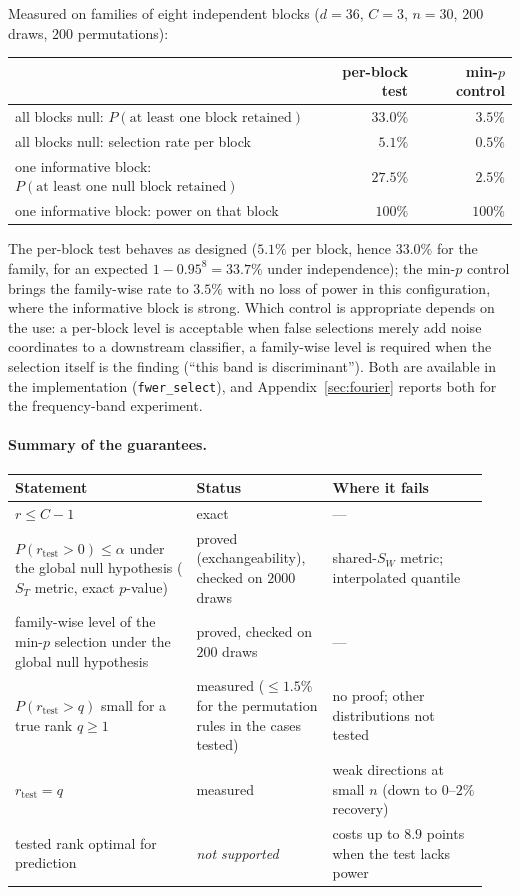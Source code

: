 \documentclass[11pt,a4paper]{article}
\theoremstyle{plain}
\theoremstyle{definition}
\theoremstyle{remark}
\begin{document}
Measured on families of eight independent blocks ($d=36$, $C=3$, $n=30$,
$200$ draws, $200$ permutations):
\begin{center}\small
\begin{tabular}{@{}lrr@{}}
\toprule
 & per-block test & min-$p$ control \\
\midrule
all blocks null: $P(\text{at least one block retained})$ & $33.0\%$ & $3.5\%$ \\
all blocks null: selection rate per block & $5.1\%$ & $0.5\%$ \\
one informative block: $P(\text{at least one null block retained})$ & $27.5\%$ & $2.5\%$ \\
one informative block: power on that block & $100\%$ & $100\%$ \\
\bottomrule
\end{tabular}
\end{center}
The per-block test behaves as designed ($5.1\%$ per block, hence
$33.0\%$ for the family, for an expected $1-0.95^8=33.7\%$ under
independence); the min-$p$ control brings the family-wise rate to $3.5\%$
with no loss of power in this configuration, where the informative block
is strong. Which control is appropriate depends on the use: a per-block
level is acceptable when false selections merely add noise coordinates to
a downstream classifier, a family-wise level is required when the
selection itself is the finding (``this band is discriminant''). Both are
available in the implementation (\texttt{fwer\_select}), and
Appendix~\ref{sec:fourier} reports both for the frequency-band experiment.

\paragraph{Summary of the guarantees.}
\begin{center}\small\renewcommand{\arraystretch}{1.15}
\begin{tabular}{@{}p{0.36\linewidth}p{0.27\linewidth}p{0.31\linewidth}@{}}
\toprule
\textbf{Statement} & \textbf{Status} & \textbf{Where it fails} \\
\midrule
$r\le C-1$ & exact & --- \\
$P(r_{\mathrm{test}}>0)\le\alpha$ under the global null hypothesis ($S_T$ metric, exact $p$-value) & proved (exchangeability), checked on $2000$ draws & shared-$S_W$ metric; interpolated quantile \\
family-wise level of the min-$p$ selection under the global null hypothesis & proved, checked on $200$ draws & --- \\
$P(r_{\mathrm{test}}>q)$ small for a true rank $q\ge1$ & measured ($\le1.5\%$ for the permutation rules in the cases tested) & no proof; other distributions not tested \\
$r_{\mathrm{test}}=q$ & measured & weak directions at small $n$ (down to $0$--$2\%$ recovery) \\
tested rank optimal for prediction & \emph{not supported} & costs up to $8.9$ points when the test lacks power \\
\bottomrule
\end{tabular}
\end{center}
\end{document}
